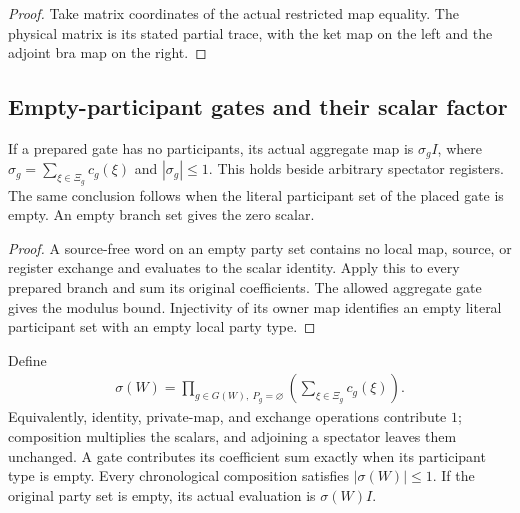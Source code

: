 \begin{proof}
    \leanok
    Take matrix coordinates of the actual restricted map equality. The physical
    matrix is its stated partial trace, with the ket map on the left and the
    adjoint bra map on the right.
\end{proof}

\subsection{Empty-participant gates and their scalar factor}
\begin{theorem}
    \label{thm:peps_chrono_empty_gate}
    \leanok
    If a prepared gate has no participants, its actual aggregate map is
    $\sigma_g I$, where $\sigma_g=\sum_{\xi\in\Xi_g}c_g(\xi)$ and
    $|\sigma_g|\le1$. This holds beside arbitrary spectator registers.
    The same conclusion follows when the literal participant set of the placed
    gate is empty. An empty branch set gives the zero scalar.
\end{theorem}

\begin{proof}
    \leanok
    A source-free word on an empty party set contains no local map, source, or
    register exchange and evaluates to the scalar identity. Apply this to every
    prepared branch and sum its original coefficients. The allowed aggregate
    gate gives the modulus bound. Injectivity of its owner map identifies an
    empty literal participant set with an empty local party type.
\end{proof}

\begin{definition}
    \label{def:peps_chrono_empty_scalar}
    \leanok
    Define
    \begin{align}
        \sigma(W)=\prod_{g\in G(W),\ P_g=\varnothing}
        \left(\sum_{\xi\in\Xi_g}c_g(\xi)\right).
        \label{eq:peps_chrono_empty_scalar}
    \end{align}
    Equivalently, identity, private-map, and exchange operations contribute $1$;
    composition multiplies the scalars, and adjoining a spectator leaves them
    unchanged. A gate contributes its coefficient sum exactly when its participant
    type is empty. Every chronological composition satisfies $|\sigma(W)|\le1$.
    If the original party set is empty, its actual evaluation is $\sigma(W)I$.
\end{definition}

